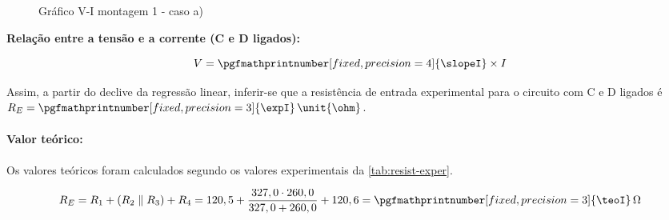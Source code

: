 \begin{figure}[!ht]
	\centering
	\caption{Gráfico V-I montagem 1 - caso a)}
	\label{gra:mont1-alinA}
\end{figure}

\textbf{Relação entre a tensão e a corrente (C e D ligados):}

\begin{equation}
	V = \pgfmathprintnumber[fixed, precision=4]{\slopeI} \times I
	\label{eq:regLin1}
\end{equation}

Assim, a partir do declive da regressão linear, inferir-se que a resistência de entrada experimental para o circuito com C e D ligados é $R_E=\pgfmathprintnumber[fixed, precision=3]{\expI}\,\unit{\ohm}$.

\paragraph{\textbf{Valor teórico:}}
\paragraph{}

Os valores teóricos foram calculados segundo os valores experimentais da \cref{tab:resist-exper}.

\begin{equation}
	R_E= R_1+ ({R_2 \parallel R_3})+R_4 = 120,5+\frac{327,0 \cdot 260,0}{327,0 + 260,0}+120,6 = \pgfmathprintnumber[fixed, precision=3]{\teoI}\,\Omega
\end{equation}

